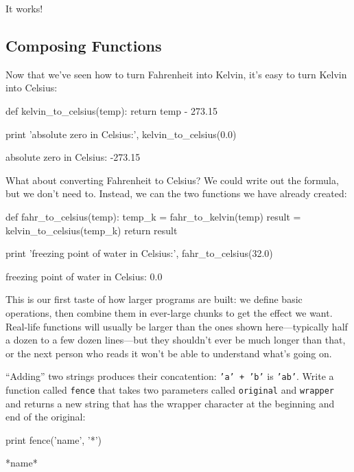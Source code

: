 \documentclass{book}
\begin{document}
It works!

\subsection{Composing Functions}

Now that we've seen how to turn Fahrenheit into Kelvin, it's easy to
turn Kelvin into Celsius:

\begin{VerbIn}
def kelvin_to_celsius(temp):
    return temp - 273.15

print 'absolute zero in Celsius:', kelvin_to_celsius(0.0)
\end{VerbIn}

\begin{VerbOut}
absolute zero in Celsius: -273.15
\end{VerbOut}

What about converting Fahrenheit to Celsius? We could write out the
formula, but we don't need to. Instead, we can
 the two functions we have
already created:

\begin{VerbIn}
def fahr_to_celsius(temp):
    temp_k = fahr_to_kelvin(temp)
    result = kelvin_to_celsius(temp_k)
    return result

print 'freezing point of water in Celsius:', fahr_to_celsius(32.0)
\end{VerbIn}

\begin{VerbOut}
freezing point of water in Celsius: 0.0
\end{VerbOut}

This is our first taste of how larger programs are built: we define
basic operations, then combine them in ever-large chunks to get the
effect we want. Real-life functions will usually be larger than the ones
shown here---typically half a dozen to a few dozen lines---but they
shouldn't ever be much longer than that, or the next person who reads it
won't be able to understand what's going on.

\begin{challenge}
  ``Adding'' two strings produces their concatention: \texttt{'a' + 'b'}
  is \texttt{'ab'}. Write a function called \texttt{fence} that takes
  two parameters called \texttt{original} and \texttt{wrapper} and
  returns a new string that has the wrapper character at the beginning
  and end of the original:

\begin{VerbIn}
print fence('name', '*')
\end{VerbIn}

\begin{VerbOut}
*name*
\end{VerbOut}
\end{challenge}
\end{document}
